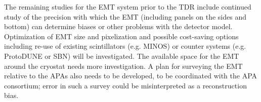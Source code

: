 





The remaining studies for the EMT system prior to the TDR include continued study of the precision with which the EMT (including panels on the sides and bottom) can determine biases or other problems with the detector model. Optimization of EMT size and pixelization and possible cost-saving options including re-use of existing scintillators (e.g. MINOS) or counter systems (e.g. ProtoDUNE or SBN) will be investigated. The available space for the EMT around the cryostat needs more investigation. A plan for surveying the EMT relative to the APAs also needs to be developed, to be coordinated with the APA consortium; error in such a survey could be misinterpreted as a reconstruction bias. %

